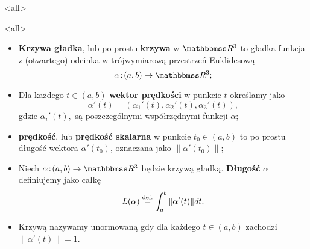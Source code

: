 \mode*
\mode<all>{}

\begin{frame}[<+->]
\begin{center}
\begin{tikzpicture}[y=0.80pt, x=0.8pt,scale=0.7,yscale=-1, inner sep=0pt, outer sep=0pt]

\end{tikzpicture}
\end{center}
\end{frame}
\mode<all>{}
\begin{frame}[<+->]
\begin{definicja}
\begin{itemize}
\item\textbf{Krzywa gładka}, lub po prostu \textbf{krzywa} w $\R^3$ to gładka funkcja z (otwartego) odcinka w trójwymiarową przestrzeń Euklidesową \[\alpha\colon (a,b)\to \R^3;\]
\item Dla każdego $t\in (a,b)$ \textbf{wektor prędkości} w punkcie $t$ określamy jako \[\alpha'(t)=(\alpha_1'(t),\alpha_2'(t),\alpha_3'(t)),\]gdzie $\alpha_i'(t),$ są poszczególnymi współrzędnymi funkcji $\alpha$;
\item \textbf{prędkość}, lub \textbf{prędkość skalarna} w punkcie $t_0\in (a,b)$ to po prostu długość wektora $\alpha'(t_0)$, oznaczana jako $\|\alpha'(t_0)\|$;
\end{itemize}
\end{definicja}
\end{frame}
\begin{frame}[<+->]

\begin{definicja}
\begin{itemize}
\item Niech $\alpha\colon (a,b)\to \R^3$ będzie krzywą gładką. \textbf{Długość} $\alpha$ definiujemy jako całkę
\[L(\alpha)\define\int_a^b\|\alpha'(t)\|dt.\]
\item Krzywą nazywamy unormowaną gdy dla każdego $t\in (a,b)$ zachodzi $\|\alpha'(t)\|=1$.
\end{itemize}

\end{definicja}

\end{frame}
